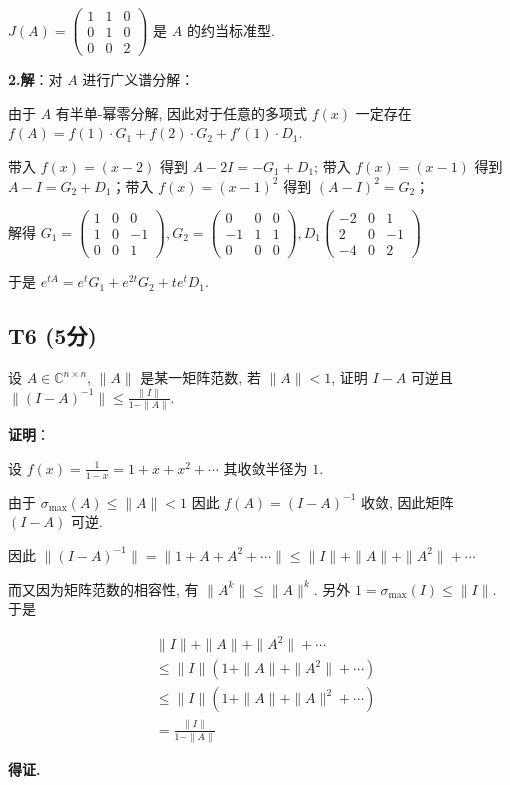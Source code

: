 \documentclass{article}
\begin{document}
$J(A)=\begin{pmatrix}
	1 & 1 & 0\\
	0 & 1 & 0\\
	0 & 0 & 2
\end{pmatrix}$ 是 $A$ 的约当标准型.

\par \textbf{2.解}：对 $A$ 进行广义谱分解：

由于 $A$ 有半单-幂零分解, 因此对于任意的多项式 $f(x)$ 一定存在 $f(A)=f(1)\cdot G_1 + f(2)\cdot G_2 + f'(1) \cdot D_1$.

带入 $f(x)=(x-2)$ 得到 $A-2I=- G_1+D_1$; 带入 $f(x)=(x-1)$ 得到 $A-I=G_2+D_1$；带入 $f(x)=(x-1)^2$ 得到 $(A-I)^2=G_2$；

解得 $G_1=\begin{pmatrix}
	1 & 0 & 0\\
	1 & 0 & -1\\
	0 & 0 & 1
\end{pmatrix}, G_2=\begin{pmatrix}
	0 & 0 & 0\\
	-1 & 1 & 1\\
	0 & 0 & 0
\end{pmatrix}, D_1\begin{pmatrix}
	-2 & 0 & 1\\
	2 & 0 & -1\\
	-4 & 0 & 2
\end{pmatrix}$

于是 $e^{tA}=e^tG_1+e^{2t}G_2+te^{t}D_1$.

\subsection{T6 (5分)}

\par 设 $A\in \mathbb C^{n\times n}$, $\|A\|$ 是某一矩阵范数, 若 $\|A\|<1$, 证明 $I-A$ 可逆且 $\|(I-A)^{-1}\|\leq\frac{\|I\|}{1-\|A\|}$.

\par \textbf{证明}：

设 $f(x)=\frac{1}{1-x}=1+x+x^2+\cdots$ 其收敛半径为 $1$.

由于 $\sigma_{\max}(A)\leq \|A\| < 1$ 因此 $f(A)=(I-A)^{-1}$ 收敛, 因此矩阵 $(I-A)$ 可逆.

因此 $\|(I-A)^{-1}\|=\|1+A+A^2+\cdots\|\leq \|I\|+\|A\|+\|A^2\|+\cdots$

而又因为矩阵范数的相容性, 有 $\|A^k\|\leq \|A\|^k$. 另外 $1 = \sigma_{\max}(I) \leq \|I\|$. 于是

\begin{align*}
	&\|I\|+\|A\|+\|A^2\|+\cdots\\
	&\leq \|I\|(1 + \|A\| + \|A^2\| + \cdots)\\
	&\leq \|I\|(1 + \|A\| + \|A\|^2 + \cdots)\\
	&=\frac{\|I\|}{1-\|A\|}
\end{align*}

\textbf{得证.}
\end{document}
